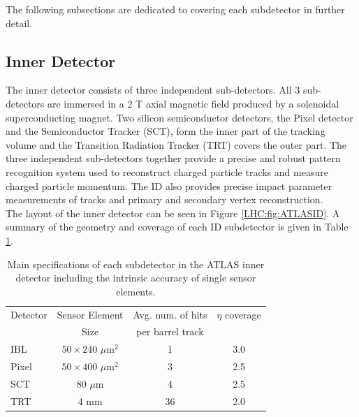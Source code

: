\indent The following subsections are dedicated to covering each subdetector in further detail. \\

\subsection{ Inner Detector }
\label{LHC:ID}

\indent The inner detector consists of three independent sub-detectors.  All 3 sub-detectors are immersed in a 2 T axial magnetic field produced by a solenoidal superconducting magnet.  Two silicon semiconductor detectors, the Pixel detector and the Semiconductor Tracker (SCT), form the inner part of the tracking volume and the Transition Radiation Tracker (TRT) covers the outer part.  The three independent sub-detectors together provide a precise and robust pattern recognition system used to reconstruct charged particle tracks and measure charged particle momentum.  The ID also provides precise impact parameter measurements of tracks and primary and secondary vertex reconstruction.   \\

\indent The layout of the inner detector can be seen in Figure \ref{LHC:fig:ATLASID}.  A summary of the geometry and coverage of each ID subdetector is given in Table \ref{tab:IDspec}.  \\

\begin{table}[h!]
  \caption{ Main specifications of each subdetector in the ATLAS inner detector including the intrinsic accuracy of single sensor elements. }
  \label{tab:IDspec}
  \begin{center}
    \begin{tabular}{l c c c} \hline
      Detector & Sensor Element & Avg. num. of hits & $\eta$ coverage \\ 
                     &  Size & per barrel track  & \\ \hline
      IBL         & $50\times240$ $\mu$m$^2$ & 1 & 3.0 \\ 
      Pixel       & $50\times400$ $\mu$m$^2$  & 3 & 2.5\\ 
      SCT        & 80 $\mu$m & 4 & 2.5\\ 
      TRT        &  4 mm & 36 & 2.0 \\ \hline
    \end{tabular}
  \end{center}
\end{table}

